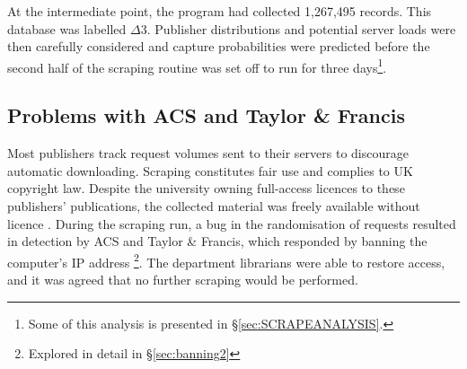 At the intermediate point, the program had collected 1,267,495 records. This database was labelled $\Delta3$. Publisher distributions and potential server loads were then carefully considered and capture probabilities were predicted before the second half of the scraping routine was set off to run for three days\footnote{Some of this analysis is presented in \S\ref{sec:SCRAPEANALYSIS}.}.
\subsection{Problems with ACS and Taylor \& Francis}
\label{sec:banning1}
Most publishers track request volumes sent to their servers to discourage automatic downloading. Scraping constitutes fair use and complies to UK copyright law. Despite the university owning full-access licences to these publishers' publications, the collected material was freely available without licence \cite{thelaw}\cite{contentminelegal}. During the scraping run, a bug in the randomisation of requests resulted in detection by ACS and Taylor \& Francis, which responded by banning the computer's IP address \footnote{Explored in detail in \S\ref{sec:banning2}}. The department librarians were able to restore access, and it was agreed that no further scraping would be performed.
